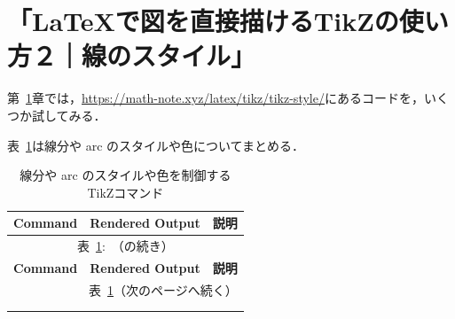 \documentclass[lualatex]{jlreq}
\begin{document}
\section{「\LaTeX{}で図を直接描けるTikZの使い方２｜線のスタイル」}
\label{linestyle}

第~\ref{linestyle}章では，\url{https://math-note.xyz/latex/tikz/tikz-style/}にあるコードを，いくつか試してみる．

表~\ref{tab:linestylecolor}は線分や arc のスタイルや色についてまとめる．
\begin{longtable}{p{\cwA} p{\cwB} p{\cwC}}
    \caption{線分や arc のスタイルや色を制御するTikZコマンド} \label{tab:linestylecolor}                 \\[-1em]
    \toprule
    \textbf{Command} & \textbf{Rendered Output} & \textbf{説明}                         \\
    \midrule
    \endfirsthead %

    \multicolumn{3}{c}{表~\ref{tab:linestylecolor}:~\nameref{tab:linestylecolor}（の続き）} \\[0.3em]
    \toprule
    \textbf{Command} & \textbf{Rendered Output} & \textbf{説明}                         \\
    \midrule
    \endhead %

    \multicolumn{3}{r}{表~\ref{tab:linestylecolor}（次のページへ続く）}                          \\
    \midrule
    \endfoot %

    \midrule
    \multicolumn{3}{r}{表~\ref{tab:linestylecolor}終了}                                  \\
    \bottomrule
    \endlastfoot %


\end{longtable}
\end{document}
